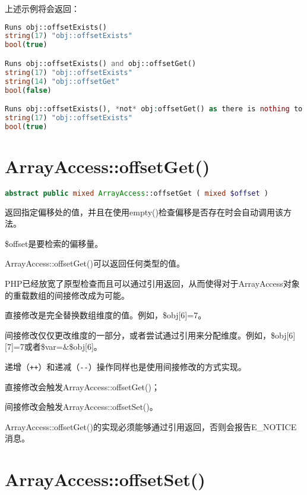 上述示例将会返回：



\begin{lstlisting}[language=PHP]
Runs obj::offsetExists()
string(17) "obj::offsetExists"
bool(true)

Runs obj::offsetExists() and obj::offsetGet()
string(17) "obj::offsetExists"
string(14) "obj::offsetGet"
bool(false)

Runs obj::offsetExists(), *not* obj:offsetGet() as there is nothing to get
string(17) "obj::offsetExists"
bool(true)
\end{lstlisting}

\section{ArrayAccess::offsetGet()}



\begin{lstlisting}[language=PHP]
abstract public mixed ArrayAccess::offsetGet ( mixed $offset )
\end{lstlisting}

返回指定偏移处的值，并且在使用empty()检查偏移是否存在时会自动调用该方法。

\$offset是要检索的偏移量。

ArrayAccess::offsetGet()可以返回任何类型的值。

PHP已经放宽了原型检查而且可以通过引用返回，从而使得对于ArrayAccess对象的重载数组的间接修改成为可能。

\begin{compactitem}
\item 直接修改是完全替换数组维度的值。例如，\$obj[6]=7。
\item 间接修改仅仅更改维度的一部分，或者尝试通过引用来分配维度。例如，\$obj[6][7]=7或者\$var=\&\$obj[6]。
\end{compactitem}

递增（\texttt{++}）和递减（\texttt{-\/-}）操作同样也是使用间接修改的方式实现。

\begin{compactitem}
\item 直接修改会触发ArrayAccess::offsetGet()；
\item 间接修改会触发ArrayAccess::offsetSet()。
\end{compactitem}

ArrayAccess::offsetGet()的实现必须能够通过引用返回，否则会报告E\_NOTICE消息。

\section{ArrayAccess::offsetSet()}




